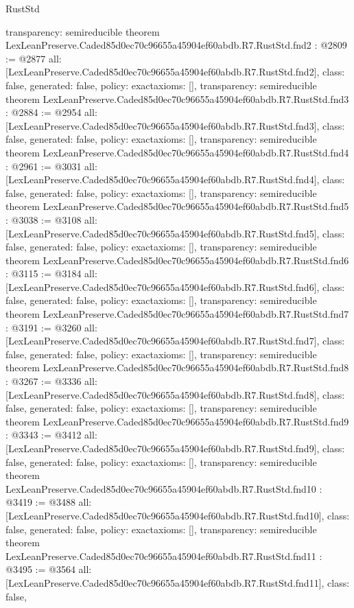 \begin{lexlean}{RustStd}
\begin{coremodule}
{  transparency: semireducible
}
theorem LexLeanPreserve.Caded85d0ec70c96655a45904ef60abdb.R7.RustStd.fnd2 : @2809 := @2877 {
  all: [LexLeanPreserve.Caded85d0ec70c96655a45904ef60abdb.R7.RustStd.fnd2],
  class: false,
  generated: false,
  policy: exact{axioms: []},
  transparency: semireducible
}
theorem LexLeanPreserve.Caded85d0ec70c96655a45904ef60abdb.R7.RustStd.fnd3 : @2884 := @2954 {
  all: [LexLeanPreserve.Caded85d0ec70c96655a45904ef60abdb.R7.RustStd.fnd3],
  class: false,
  generated: false,
  policy: exact{axioms: []},
  transparency: semireducible
}
theorem LexLeanPreserve.Caded85d0ec70c96655a45904ef60abdb.R7.RustStd.fnd4 : @2961 := @3031 {
  all: [LexLeanPreserve.Caded85d0ec70c96655a45904ef60abdb.R7.RustStd.fnd4],
  class: false,
  generated: false,
  policy: exact{axioms: []},
  transparency: semireducible
}
theorem LexLeanPreserve.Caded85d0ec70c96655a45904ef60abdb.R7.RustStd.fnd5 : @3038 := @3108 {
  all: [LexLeanPreserve.Caded85d0ec70c96655a45904ef60abdb.R7.RustStd.fnd5],
  class: false,
  generated: false,
  policy: exact{axioms: []},
  transparency: semireducible
}
theorem LexLeanPreserve.Caded85d0ec70c96655a45904ef60abdb.R7.RustStd.fnd6 : @3115 := @3184 {
  all: [LexLeanPreserve.Caded85d0ec70c96655a45904ef60abdb.R7.RustStd.fnd6],
  class: false,
  generated: false,
  policy: exact{axioms: []},
  transparency: semireducible
}
theorem LexLeanPreserve.Caded85d0ec70c96655a45904ef60abdb.R7.RustStd.fnd7 : @3191 := @3260 {
  all: [LexLeanPreserve.Caded85d0ec70c96655a45904ef60abdb.R7.RustStd.fnd7],
  class: false,
  generated: false,
  policy: exact{axioms: []},
  transparency: semireducible
}
theorem LexLeanPreserve.Caded85d0ec70c96655a45904ef60abdb.R7.RustStd.fnd8 : @3267 := @3336 {
  all: [LexLeanPreserve.Caded85d0ec70c96655a45904ef60abdb.R7.RustStd.fnd8],
  class: false,
  generated: false,
  policy: exact{axioms: []},
  transparency: semireducible
}
theorem LexLeanPreserve.Caded85d0ec70c96655a45904ef60abdb.R7.RustStd.fnd9 : @3343 := @3412 {
  all: [LexLeanPreserve.Caded85d0ec70c96655a45904ef60abdb.R7.RustStd.fnd9],
  class: false,
  generated: false,
  policy: exact{axioms: []},
  transparency: semireducible
}
theorem LexLeanPreserve.Caded85d0ec70c96655a45904ef60abdb.R7.RustStd.fnd10 : @3419 := @3488 {
  all: [LexLeanPreserve.Caded85d0ec70c96655a45904ef60abdb.R7.RustStd.fnd10],
  class: false,
  generated: false,
  policy: exact{axioms: []},
  transparency: semireducible
}
theorem LexLeanPreserve.Caded85d0ec70c96655a45904ef60abdb.R7.RustStd.fnd11 : @3495 := @3564 {
  all: [LexLeanPreserve.Caded85d0ec70c96655a45904ef60abdb.R7.RustStd.fnd11],
  class: false,
}
\end{coremodule}
\end{lexlean}
